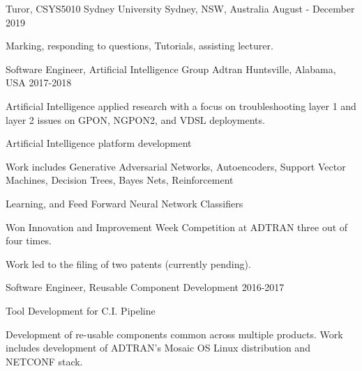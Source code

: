 

\begin{cventries}
  \cventry
    {Turor, CSYS5010} %
    {Sydney University} %
    {Sydney, NSW, Australia} %
    {August - December 2019} %
    {
      \begin{cvitems} %
\item Marking, responding to questions, Tutorials, assisting lecturer.
      \end{cvitems}
    }
  \cventry
    {Software Engineer, Artificial Intelligence Group} %
    {Adtran} %
    {Huntsville, Alabama, USA} %
    {2017-2018} %
    {
      \begin{cvitems} %
\item Artificial Intelligence applied research with a focus on troubleshooting layer 1 and layer 2 issues on GPON, NGPON2, and VDSL deployments.
\item Artificial Intelligence platform development
\item Work includes Generative Adversarial Networks, Autoencoders, Support Vector Machines, Decision Trees, Bayes Nets, Reinforcement
\item Learning, and Feed Forward Neural Network Classifiers
\item  Won Innovation and Improvement Week Competition at ADTRAN three out of four times.
\item  Work led to the filing of two patents (currently pending).
      \end{cvitems}
    }

  \cventry
    {Software Engineer, Reusable Component Development} %
    {} %
    {} %
    {2016-2017} %
    {
      \begin{cvitems} %
\item  Tool Development for C.I. Pipeline
\item  Development of re-usable components common across multiple products. Work includes development of ADTRAN’s Mosaic OS Linux distribution and NETCONF stack.
      \end{cvitems}
    }


\end{cventries}
